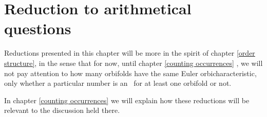 \chapter{Reduction to arithmetical questions}\label{reduction_to_arithmetical}
Reductions presented in this chapter will be more in the spirit of chapter \ref{order structure}, 
in the sense that 
for now, until chapter \ref{counting occurrences} 
, we will not pay attention 
to how many orbifolds have the same Euler orbicharacteristic, only whether a particular 
number is an \Eoc\ for at least one orbifold or not. 

In chapter \ref{counting occurrences} we will explain how these reductions will be relevant 
to the discussion held there. 


